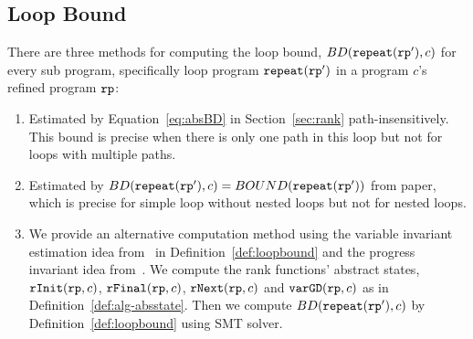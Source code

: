 
\subsection{Loop Bound}
There are three methods for computing the loop bound, $BD(\mathtt{repeat}(\mathtt{rp}'), c)$ for every sub program, specifically loop program $\mathtt{repeat}(\mathtt{rp}')$ in a program $c$'s refined program $\mathtt{rp}$:
\begin{enumerate}
  \item Estimated by Equation~\ref{eq:absBD} in Section~\ref{sec:rank} path-insensitively. This bound is precise when there is only one path in this loop but not for loops with multiple paths.
  \item Estimated by $BD(\mathtt{repeat}(\mathtt{rp}'), c) = BOUND(\mathtt{repeat}(\mathtt{rp}'))$ from paper\cite{GulwaniJK09}, which is precise for simple loop without nested loops but not for nested loops. 
  \item   We provide an alternative computation method using the variable invariant estimation idea from~\cite{SinnZV17} in Definition~\ref{def:loopbound} and the progress invariant idea from~\cite{GulwaniJK09}.
  We compute the rank functions' abstract states, $\mathtt{rInit}(\mathtt{rp}, c)$, $\mathtt{rFinal}(\mathtt{rp}, c)$, $\mathtt{rNext}(\mathtt{rp}, c)$ and $\mathtt{varGD}(\mathtt{rp}, c)$ as in Definition~\ref{def:alg-absstate}.
  Then we compute $BD(\mathtt{repeat}(\mathtt{rp}'), c)$ by Definition~\ref{def:loopbound} using SMT solver.
\end{enumerate}
%
